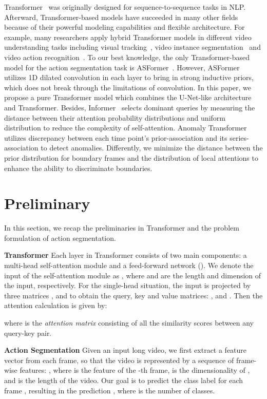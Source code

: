 \documentclass[letterpaper]{article} \usepackage[submission]{aaai23}  \usepackage{times}  \usepackage{helvet}  \usepackage{courier}  \usepackage[hyphens]{url}  \usepackage{graphicx} \urlstyle{rm} \def\UrlFont{\rm}  \usepackage{natbib}  \usepackage{caption} \frenchspacing  \setlength{\pdfpagewidth}{8.5in} \setlength{\pdfpageheight}{11in} \usepackage{algorithm}
\begin{document}
Transformer~\cite{Transformer} was originally designed for sequence-to-sequence tasks in NLP. Afterward, Transformer-based models have succeeded in many other fields because of their powerful modeling capabilities and flexible architecture. For example, many researchers apply hybrid Transformer models in different video understanding tasks including visual tracking~\cite{yan2021learning}, video instance segmentation~\cite{wang2021end} and video action recognition~\cite{girdhar2019video}. To our best knowledge, the only Transformer-based model for the action segmentation task is ASFormer~\cite{ASFormer}. However, ASFormer utilizes 1D dilated convolution in each layer to bring in strong inductive priors, which does not break through the limitations of convolution. In this paper, we propose a pure Transformer model which combines the U-Net-like architecture and Transformer. Besides, Informer~\cite{informer} selects dominant queries by measuring the distance between their attention probability distributions and uniform distribution to reduce the complexity of self-attention. Anomaly Transformer~\cite{xu2021anomaly} utilizes discrepancy between each time point’s prior-association and its series-association to detect anomalies. Differently, we minimize the distance between the prior distribution for boundary frames and the distribution of local attentions to enhance the ability to discriminate boundaries.

\section{Preliminary}
In this section, we recap the preliminaries in Transformer and the problem formulation of action segmentation.

{\bf Transformer} \quad
Each layer in Transformer consists of two main components: a multi-head self-attention module and a feed-forward network (). We denote the input of the self-attention module as , where  and  are the length and dimension of the input, respectively. For the single-head situation, the input is projected by three matrices ,  and  to obtain the query, key and value matrices: ,  and . Then the attention calculation is given by:
\begin{small}

\end{small}
where  is the \textit{attention matrix} consisting of all the similarity scores between any query-key pair.

{\bf Action Segmentation} \quad
Given an input long video, we first extract a feature vector from each frame, so that the video is represented by a sequence of frame-wise features: , where  is the feature of the -th frame,  is the dimensionality of , and  is the length of the video. Our goal is to predict the class label  for each frame , resulting in the prediction , where  is the number of classes.
\end{document}
